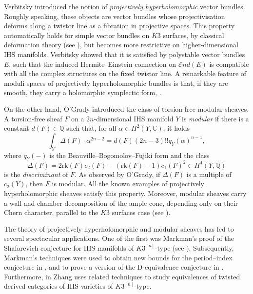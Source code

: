 \documentclass[12pt,a4paper]{amsart}
\theoremstyle{plain}
\theoremstyle{definition}
\theoremstyle{remark}
\def\H{H}
\def\QQ{\mathbb{Q}}
\newcommand{\CC}{\mathbb{C}}
\newcommand{\rk}{\mathrm{rk}}
\newcommand{\cc}{c}
\begin{document}
Verbitsky \cite{verbitsky-hyperholomorphic-bundles} introduced the notion of \emph{projectively hyperholomorphic} vector bundles. Roughly speaking, these objects are vector bundles whose projectivisation deforms along a twistor line as a fibration in projective spaces. This property automatically holds for simple vector bundles on $K3$ surfaces, by classical deformation theory (see \cite[Corollary 2.1.5]{ogrady-moduli-sheaves-hk}), but becomes more restrictive on higher-dimensional IHS manifolds. Verbitsky showed that it is satisfied by polystable vector bundles $E$, such that the induced Hermite--Einstein connection on $\mathcal{E}nd(E)$ is compatible with all the complex structures on the fixed twistor line. A remarkable feature of moduli spaces of projectively hyperholomorphic bundles is that, if they are smooth, they carry a holomorphic symplectic form, \cite[Section 9]{verbitsky-hyperholomorphic-bundles}.

On the other hand, O'Grady \cite{OG22} introduced the class of torsion-free modular sheaves. A torsion-free sheaf $F$ on a $2n$-dimensional IHS manifold $Y$ is \emph{modular} if there is a constant $d(F)\in \QQ$ such that, for all $\alpha\in \H^2(Y,\CC)$, it holds
    \begin{equation*}
        \int_Y \Delta(F)\cdot\alpha^{2n-2}=
        d(F)(2n-3)!!q_Y(\alpha)^{n-1},
    \end{equation*}
    where $q_Y(-)$ is the Beauville--Bogomolov--Fujiki form and the class 
    \[\Delta(F)=2\rk(F)\cc_2(F)-(\rk(F)-1)\cc_1(F)^2 \in \H^4(Y,\QQ)\]
    is the \textit{discriminant} of $F$. As observed by O'Grady, if $\Delta(F)$ is a multiple of $\cc_2(Y)$, then $F$ is modular. 
All the known examples of projectively hyperholomorphic sheaves satisfy this property.
Moreover, modular sheaves carry a wall-and-chamber decomposition of the ample cone, depending only on their Chern character, parallel to the $K3$ surfaces case (see \cite[Section 3]{OG22}).

The theory of projectively hyperholomorphic and modular sheaves has led to several spectacular applications. 
One of the first was Markman's proof of the Shafarevich conjecture for IHS manifolds of $K3^{[n]}$-type (see \cite{markman}). 
Subsequently, Markman's techniques were used to obtain new bounds for the period--index conjecture in \cite{hotchkissetal},
and to prove a version of the $\mathrm{D}$-equivalence conjecture in \cite{dequivconj}. Furthermore, in \cite{zhang} Zhang uses related techniques to study equivalences of twisted derived categories of IHS varieties of $K3^{[n]}$-type.
\end{document}
